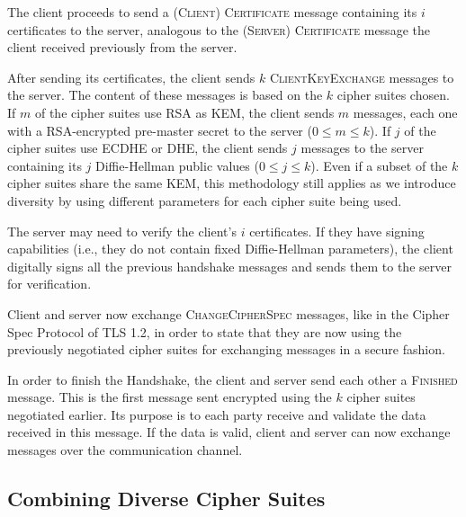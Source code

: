 \documentclass{sig-alternate-05-2015}
\newcommand{\msg}[1]{\textsc{{#1}}}
\begin{document}
The client proceeds to send a \msg{(Client) Certificate} message containing its $i$ certificates to the server, analogous to the \msg{(Server) Certificate} message the client received previously from the server.

After sending its certificates, the client sends $k$ \msg{ClientKeyExchange} messages to the server. The content of these messages is based on the $k$ cipher suites chosen. If $m$ of the cipher suites use RSA as KEM, the client sends $m$ messages, each one with a RSA-encrypted pre-master secret to the server ($0 \leq m \leq k$). If $j$ of the cipher suites use ECDHE or DHE, the client sends $j$ messages to the server containing its $j$ Diffie-Hellman public values ($0 \leq j \leq k$). Even if a subset of the $k$ cipher suites share the same KEM, this methodology still applies as we introduce diversity by using different parameters for each cipher suite being used.

The server may need to verify the client's $i$ certificates. If they have signing capabilities (i.e., they do not contain fixed Diffie-Hellman parameters), the client digitally signs all the previous handshake messages and sends them to the server for verification.

Client and server now exchange \msg{ChangeCipherSpec} messages, like in the Cipher Spec Protocol of TLS 1.2, in order to state that they are now using the previously negotiated cipher suites for exchanging messages in a secure fashion.

In order to finish the Handshake, the client and server send each other a \msg{Finished} message. This is the first message sent encrypted using the $k$ cipher suites negotiated earlier. Its purpose is to each party receive and validate the data received in this message. If the data is valid, client and server can now exchange messages over the communication channel.

\subsection{Combining Diverse Cipher Suites}
\end{document}
